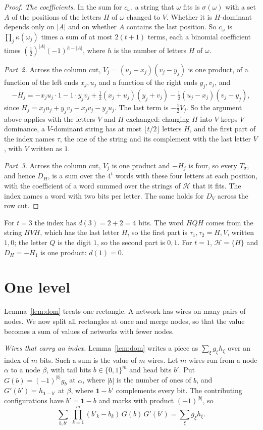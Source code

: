\documentclass[11pt]{article}
\newcommand{\Hs}{\mathcal H}
\begin{document}
\begin{proof}
\emph{The coefficients.} In the sum for $c_\omega$, a string that $\omega$ fits is $\sigma(\omega)$ with a set $A$ of the positions of the letters $H$ of $\omega$ changed to $V$. Whether it is $H$-dominant depends only on $|A|$ and on whether $A$ contains the last position. So $c_\omega$ is $\prod_j\kappa(\omega_j)$ times a sum of at most $2(t+1)$ terms, each a binomial coefficient times $(\frac12)^{|A|}(-1)^{h-|A|}$, where $h$ is the number of letters $H$ of $\omega$.

\emph{Part~2.} Across the column cut, $V_j=(u_j-x_j)(v_j-y_j)$ is one product, of a function of the left ends $x_j,u_j$ and a function of the right ends $y_j,v_j$, and
\[
-H_j=-x_ju_j\cdot1-1\cdot y_jv_j+\tfrac12(x_j+u_j)(y_j+v_j)-\tfrac12(u_j-x_j)(v_j-y_j),
\]
since $H_j=x_ju_j+y_jv_j-x_jv_j-y_ju_j$. The last term is $-\frac12V_j$. So the argument above applies with the letters $V$ and $H$ exchanged: changing $H$ into $V$ keeps $V$-dominance, a $V$-dominant string has at most $\lfloor t/2\rfloor$ letters $H$, and the first part of the index names $\tau$, the one of the string and its complement with the last letter $V$, with $V$ written as $1$.

\emph{Part~3.} Across the column cut, $V_j$ is one product and $-H_j$ is four, so every $T_\sigma$, and hence $D_H$, is a sum over the $4^t$ words with these four letters at each position, with the coefficient of a word summed over the strings of $\Hs$ that it fits. The index names a word with two bits per letter. The same holds for $D_V$ across the row cut.
\end{proof}

For $t=3$ the index has $d(3)=2+2=4$ bits. The word $HQH$ comes from the string $HVH$, which has the last letter $H$, so the first part is $\tau_1,\tau_2=H,V$, written $1,0$; the letter $Q$ is the digit $1$, so the second part is $0,1$. For $t=1$, $\Hs=\{H\}$ and $D_H=-H_1$ is one product: $d(1)=0$.

\section{One level}\label{sec:step}

Lemma~\ref{lem:dom} treats one rectangle. A network has wires on many pairs of nodes. We now split all rectangles at once and merge nodes, so that the value becomes a sum of values of networks with fewer nodes.

\emph{Wires that carry an index.} Lemma~\ref{lem:dom} writes a piece as $\sum_\xi g_\xi h_\xi$ over an index of $m$ bits. Such a sum is the value of $m$ wires. Let $m$ wires run from a node $\alpha$ to a node $\beta$, with tail bits $b\in\{0,1\}^m$ and head bits $b'$. Put $G(b)=(-1)^{|b|}g_b$ at $\alpha$, where $|b|$ is the number of ones of $b$, and $G'(b')=h_{\mathbf1-b'}$ at $\beta$, where $\mathbf1-b'$ complements every bit. The contributing configurations have $b'=\mathbf1-b$ and marks with product $(-1)^{|b|}$, so
\begin{equation}\label{index}
\sum_{b,b'}\ \prod_{k=1}^m(b'_k-b_k)\,G(b)\,G'(b')=\sum_\xi g_\xi h_\xi .
\end{equation}
\end{document}
